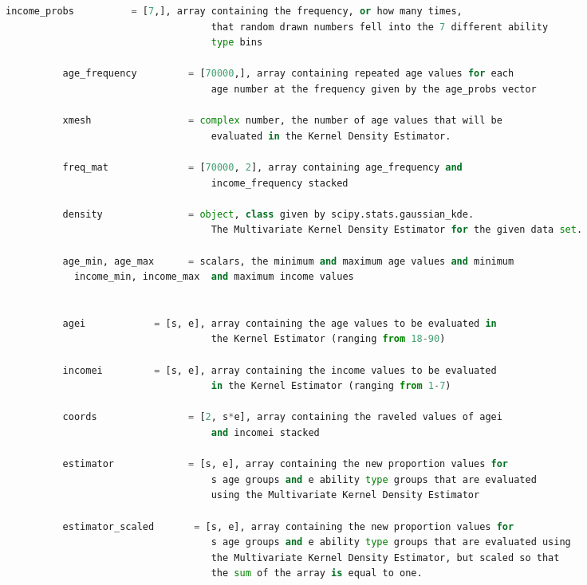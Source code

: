 \documentclass[letterpaper,12pt]{article}
\theoremstyle{definition}
\begin{document}
\begin{spacing}{1.5}
\begin{lstlisting}[language=Python, caption=MVKDE.py]
          income_probs          = [7,], array containing the frequency, or how many times,
                                    that random drawn numbers fell into the 7 different ability
                                    type bins

          age_frequency         = [70000,], array containing repeated age values for each
                                    age number at the frequency given by the age_probs vector

          xmesh                 = complex number, the number of age values that will be
                                    evaluated in the Kernel Density Estimator.

          freq_mat              = [70000, 2], array containing age_frequency and
                                    income_frequency stacked

          density               = object, class given by scipy.stats.gaussian_kde.
                                    The Multivariate Kernel Density Estimator for the given data set.

          age_min, age_max      = scalars, the minimum and maximum age values and minimum
            income_min, income_max  and maximum income values


          agei            = [s, e], array containing the age values to be evaluated in
                                    the Kernel Estimator (ranging from 18-90)

          incomei         = [s, e], array containing the income values to be evaluated
                                    in the Kernel Estimator (ranging from 1-7)

          coords                = [2, s*e], array containing the raveled values of agei
                                    and incomei stacked

          estimator             = [s, e], array containing the new proportion values for
                                    s age groups and e ability type groups that are evaluated
                                    using the Multivariate Kernel Density Estimator

          estimator_scaled       = [s, e], array containing the new proportion values for
                                    s age groups and e ability type groups that are evaluated using
                                    the Multivariate Kernel Density Estimator, but scaled so that
                                    the sum of the array is equal to one.


\end{lstlisting}
\end{spacing}
\end{document}
